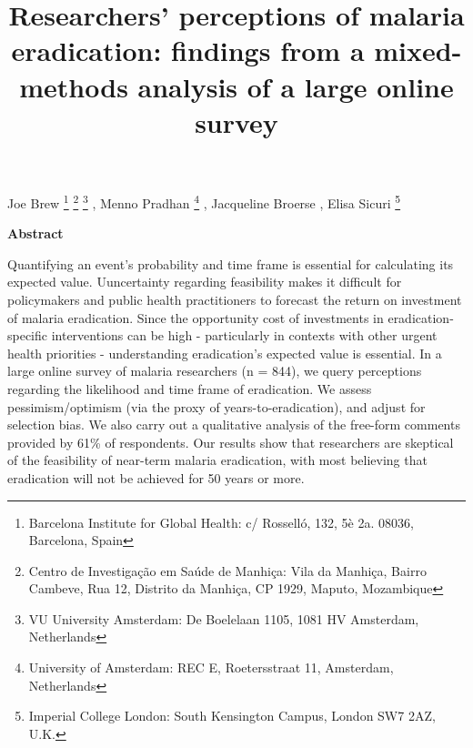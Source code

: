 \documentclass[]{article}
\title{Researchers' perceptions of malaria eradication: findings from a
mixed-methods analysis of a large online survey}
\author{}
\date{}
\let\rmarkdownfootnote\footnote%
\def\footnote{\protect\rmarkdownfootnote}
\newcommand{\footremember}[2]{%
    \footnote{#2}
    \newcounter{#1}
    \setcounter{#1}{\value{footnote}}%
}
\newcommand{\footrecall}[1]{%
    \footnotemark[\value{#1}]%
}
\begin{document}
\maketitle

\begin{center}
\begin{large}

Joe Brew\footremember{isglobal}{Barcelona Institute for Global Health: c/ Rosselló, 132, 5è 2a. 08036, Barcelona, Spain}\footremember{cism}{Centro de Investigação em Saúde de Manhiça: Vila da Manhiça, Bairro Cambeve, Rua 12, Distrito da Manhiça, CP 1929, Maputo, Mozambique}\footremember{vu}{VU University Amsterdam: De Boelelaan 1105, 1081 HV Amsterdam, Netherlands}, Menno Pradhan\footrecall{vu}\footremember{uva}{University of Amsterdam: REC E, Roetersstraat 11, Amsterdam, Netherlands}, Jacqueline Broerse\footrecall{vu}, Elisa Sicuri\footrecall{isglobal}\footremember{icl}{Imperial College London: South Kensington Campus, London SW7 2AZ, U.K.}\footrecall{cism}

\end{large}
\end{center}

\vspace{5mm}

\begin{center}
\textbf{Abstract}  
\end{center}

\vspace{5mm}

\begin{center}
\begin{changemargin}{3cm}{3cm} 

Quantifying an event's probability and time frame is essential for calculating its expected value. Uuncertainty regarding feasibility makes it difficult for policymakers and public health practitioners to forecast the return on investment of malaria eradication. Since the opportunity cost of investments in eradication-specific interventions can be high - particularly in contexts with other urgent health priorities - understanding eradication's expected value is essential. In a large online survey of malaria researchers (n = 844), we query perceptions regarding the likelihood and time frame of eradication. We assess pessimism/optimism (via the proxy of years-to-eradication), and adjust for selection bias. We also carry out a qualitative analysis of the free-form comments provided by 61\% of respondents. Our results show that researchers are skeptical of the feasibility of near-term malaria eradication, with most believing that eradication will not be achieved for 50 years or more.
\end{changemargin}
\end{center}
\end{document}
